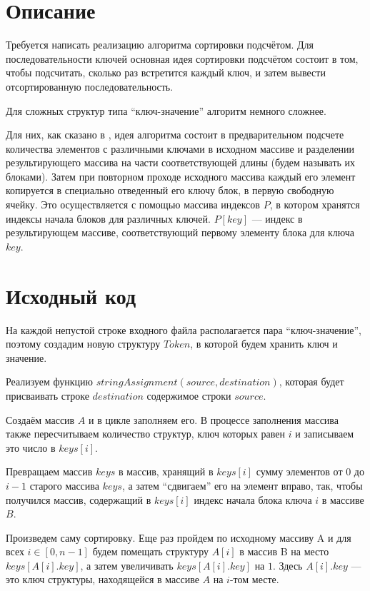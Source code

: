 \section{Описание}
Требуется написать реализацию алгоритма сортировки подсчётом.
Для последовательности ключей основная идея сортировки подсчётом состоит в том, чтобы подсчитать, сколько раз встретится каждый ключ, и затем вывести отсортированную последовательность. 

Для сложных структур типа \enquote{ключ-значение} алгоритм немного сложнее.

Для них, как сказано в \cite{cs_ifmo}, идея алгоритма состоит в предварительном подсчете количества элементов с различными ключами в исходном массиве и разделении результирующего массива на части соответствующей длины (будем называть их блоками). Затем при повторном проходе исходного массива каждый его элемент копируется в специально отведенный его ключу блок, в первую свободную ячейку. Это осуществляется с помощью массива индексов $P$, в котором хранятся индексы начала блоков для различных ключей. $P[key]$ — индекс в результирующем массиве, соответствующий первому элементу блока для ключа $key$. 

\pagebreak

\section{Исходный код}
На каждой непустой строке входного файла располагается пара \enquote{ключ-значение}, поэтому создадим новую 
структуру $Token$, в которой будем хранить ключ и значение.

Реализуем функцию $stringAssignment(source, destination)$, которая будет присваивать строке $destination$ содержимое строки $source$. 

Создаём массив $A$ и в цикле заполняем его. В процессе заполнения массива также пересчитываем количество структур, ключ которых равен $i$ и записываем это число в $keys[i]$.

Превращаем массив $keys$ в массив, хранящий в $keys[i]$ сумму элементов от $0$ до $i - 1$ старого массива $keys$, а затем \enquote{сдвигаем} его на элемент вправо, так, чтобы получился массив, содержащий в $keys[i]$ индекс начала блока ключа $i$ в массиве $B$.

Произведем саму сортировку. Еще раз пройдем по исходному массиву A и для всех $i\in[0, n - 1]$ будем помещать структуру $A[i]$ в массив B на место $keys[A[i].key]$, а затем увеличивать $keys[A[i].key]$ на $1$. Здесь $A[i].key$ — это ключ структуры, находящейся в массиве $A$ на $i$-том месте. 

